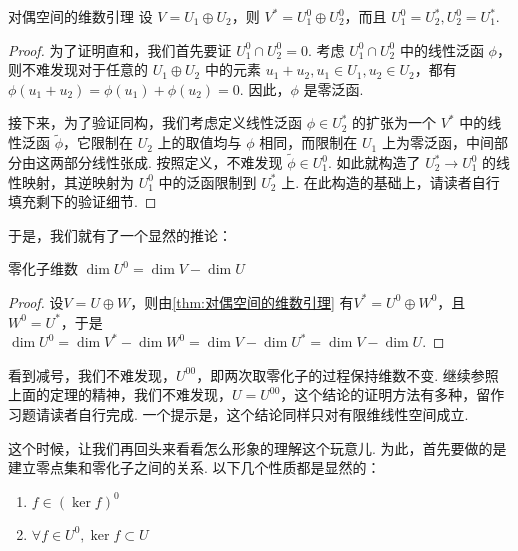\begin{theorem}{}{对偶空间的维数引理}
    设 $V = U_1 \oplus U_2$，则 $V^* = U_1^0 \oplus U_2^0$，而且 $U_1^0 = U_2^*, U_2^0 = U_1^*$.
\end{theorem}


\begin{proof}
    为了证明直和，我们首先要证 $U_1^0 \cap U_2^0 = 0$. 考虑 $U_1^0 \cap U_2^0$ 中的线性泛函 $\phi$，则不难发现对于任意的 $U_1 \oplus U_2$ 中的元素 $u_1 + u_2, u_1 \in U_1, u_2 \in U_2$，都有 $\phi(u_1 + u_2) = \phi(u_1) + \phi(u_2) = 0$. 因此，$\phi$ 是零泛函.

    接下来，为了验证同构，我们考虑定义线性泛函 $\phi \in U_2^*$ 的扩张为一个 $V^*$ 中的线性泛函 $\tilde{\phi}$，它限制在 $U_2$ 上的取值均与 $\phi$ 相同，而限制在 $U_1$ 上为零泛函，中间部分由这两部分线性张成. 按照定义，不难发现 $\tilde \phi \in U_1^0$. 如此就构造了 $U_2^* \to U_1^0$ 的线性映射，其逆映射为 $U_1^0$ 中的泛函限制到 $U_2^*$ 上. 在此构造的基础上，请读者自行填充剩下的验证细节.
\end{proof}

于是，我们就有了一个显然的推论：

\begin{theorem}{}{零化子维数}
    $\dim U^0 = \dim V - \dim U$
\end{theorem}
\begin{proof}
    设$V=U\oplus W$，则由\autoref{thm:对偶空间的维数引理} 有$V^*=U^0\oplus W^0$，且$W^0=U^*$，于是$\dim U^0=\dim V^*-\dim W^0=\dim V-\dim U^*=\dim V-\dim U$.
\end{proof}
看到减号，我们不难发现，$U^{00}$，即两次取零化子的过程保持维数不变. 继续参照上面的定理的精神，我们不难发现，$U = U^{00}$，这个结论的证明方法有多种，留作习题请读者自行完成. 一个提示是，这个结论同样只对有限维线性空间成立.

这个时候，让我们再回头来看看怎么形象的理解这个玩意儿. 为此，首先要做的是建立零点集和零化子之间的关系. 以下几个性质都是显然的：

\begin{lemma}{}{}
    \begin{enumerate}
        \item $f \in (\ker f)^0$
        \item $\forall f \in U^0, \ker f \subset U$
    \end{enumerate}
\end{lemma}

